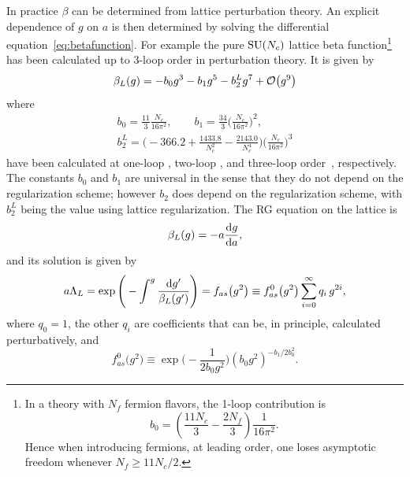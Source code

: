 In practice $\beta$ can be determined
from lattice perturbation theory. An explicit dependence of $g$ on $a$ is then
determined by solving the differential equation~\eqref{eq:betafunction}. 
For example the pure $\operatorname{SU}(N_c)$ lattice beta function\footnote{In a theory
with $N_f$ fermion flavors, the 1-loop contribution is
$$
  b_0=\left(\frac{11N_c}{3}-\frac{2N_f}{3}\right)\frac{1}{16\pi^2}.
$$
Hence when introducing fermions, at leading order, one loses asymptotic freedom
whenever $N_f\geq 11N_c/2$.} has been calculated 
up to 3-loop order in perturbation theory. It is given by
\begin{equation}\label{eq:blatgs}
  \beta_L(g)=-b_0g^3-b_1g^5-b_2^Lg^7+\order{g^{9}}
\end{equation}
where
\begin{equation}\label{eq:blat3loop}\begin{gathered}
  b_{0}= \frac{11}{3}\frac{N_c}{16\pi^2}, \qquad
  b_{1}= \frac{34}{3}\Bigg(\frac{N_c}{16\pi^2}\Bigg)^{2},\\
  b_{2}^{L}=\Bigg(-366.2+\frac{1433.8}{N_c^2}-\frac{2143.0}{N_c^4}\Bigg)
            \Bigg(\frac{N_c}{16\pi^2}\Bigg)^{3}
\end{gathered}\end{equation}
have been calculated at one-loop 
\cite{gross_d.j._ultraviolet_1973,politzer_reliable_1973}, two-loop 
\cite{belavin_calculation_1974,caswell_asymptotic_1974,jones_two-loop_1974},
and three-loop order~\cite{alle_three-loop_1997}, respectively.
The constants $b_0$ and $b_1$ are universal in the sense that they do not 
depend on the regularization scheme; however $b_2$ does depend on the
regularization scheme, with $b_2^L$ being the value using lattice
regularization. The RG equation on the lattice is
\begin{equation}
  \beta_{L}(g)=-a\dv{g}{a},
\end{equation}
and its solution is given by
\begin{equation}\label{eq:latRGEsoln}
  a\Lambda_{L}
   =\exp\Bigg(-\int^g\frac{\dd g'}{\beta_{L}(g')}\Bigg) \\
   =f_{as}\big(g^2\big)
   \equiv f_{as}^0\big(g^2\big)\sum\limits_{i=0}^{\infty}
     q_i\,g^{2i},
\end{equation}
where $q_0=1$, the other $q_i$ are coefficients that can be, in 
principle, calculated perturbatively, and
\begin{equation}\label{eq:f0}
   f_{as}^0\big(g^2\big)\equiv\exp\Bigg(-\frac{1}{2b_{0}g^2}\Bigg)
    (b_{0}g^{2})^{-b_{1}/2b_{0}^{2}}.
\end{equation}
